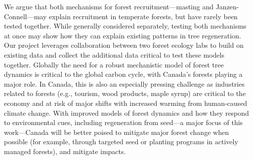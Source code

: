 \documentclass[12pt,oneside]{article}
\begin{document}
We argue that both mechanisms for forest recruitment---masting and Janzen-Connell---may explain recruitment in temperate forests, but have rarely been tested together.\cite{bogdziewicz2024evolutionary} While generally considered separately, testing both mechanisms at once may show how they can explain existing patterns in tree regeneration. Our project leverages collaboration between two forest ecology labs to build on existing data and collect the additional data critical to test these models together. 
Globally the need for a robust mechanistic model of forest tree dynamics is critical to the global carbon cycle, with Canada's forests playing a major role.\cite{ipcc2021,friedlingstein2022global} In Canada, this is also an especially pressing challenge as industries related to forests (e.g., tourism, wood products, maple syrup) are critical to the economy and at risk of major shifts with increased warming from human-caused climate change. With improved models of forest dynamics and how they respond to environmental cues, including regeneration from seed---a major focus of this work---Canada will be better poised to mitigate major forest change when possible (for example, through targeted seed or planting programs in actively managed forests), and mitigate impacts. 

\end{document}
